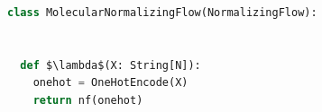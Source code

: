 \documentclass[book.tex]{subfiles}
\begin{document}
\begin{lstlisting}[language=python]
class MolecularNormalizingFlow(NormalizingFlow):
  
  
  def $\lambda$(X: String[N]):
    onehot = OneHotEncode(X)
    return nf(onehot)
\end{lstlisting}



\end{document}
